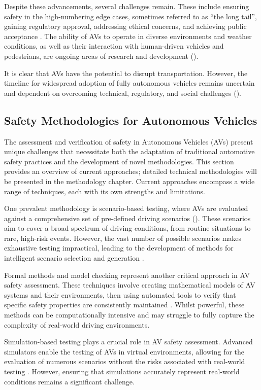 Despite these advancements, several challenges remain. These include ensuring safety in the high-numbering edge cases, sometimes referred to as ``the long tail'', gaining regulatory approval, addressing ethical concerns, and achieving public acceptance \cite{Koopman2019}. The ability of AVs to operate in diverse environments and weather conditions, as well as their interaction with human-driven vehicles and pedestrians, are ongoing areas of research and development (\cite{Yurtsever2020}).

It is clear that AVs have the potential to disrupt transportation. However, the timeline for widespread adoption of fully autonomous vehicles remains uncertain and dependent on overcoming technical, regulatory, and social challenges (\cite{Litman2023}).

\subsection{Safety Methodologies for Autonomous Vehicles}

The assessment and verification of safety in Autonomous Vehicles (AVs) present unique challenges that necessitate both the adaptation of traditional automotive safety practices and the development of novel methodologies. This section provides an overview of current approaches; detailed technical methodologies will be presented in the methodology chapter. Current approaches encompass a wide range of techniques, each with its own strengths and limitations.

One prevalent methodology is scenario-based testing, where AVs are evaluated against a comprehensive set of pre-defined driving scenarios (\cite{Feng2021}). These scenarios aim to cover a broad spectrum of driving conditions, from routine situations to rare, high-risk events. However, the vast number of possible scenarios makes exhaustive testing impractical, leading to the development of methods for intelligent scenario selection and generation \cite{Koren2018}.

Formal methods and model checking represent another critical approach in AV safety assessment. These techniques involve creating mathematical models of AV systems and their environments, then using automated tools to verify that specific safety properties are consistently maintained \cite{Luckcuck2019}. Whilst powerful, these methods can be computationally intensive and may struggle to fully capture the complexity of real-world driving environments.

Simulation-based testing plays a crucial role in AV safety assessment. Advanced simulators enable the testing of AVs in virtual environments, allowing for the evaluation of numerous scenarios without the risks associated with real-world testing \cite{Dosovitskiy2017}. However, ensuring that simulations accurately represent real-world conditions remains a significant challenge.

